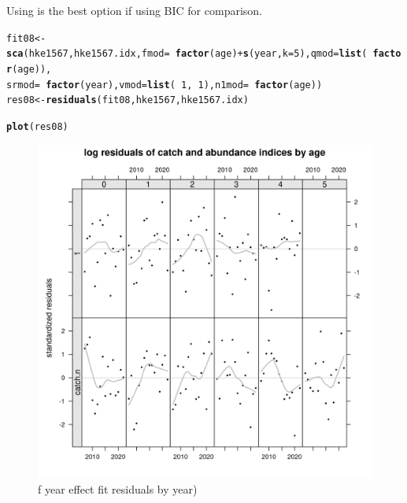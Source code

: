 \documentclass[a4paper,english,11pt]{article}\usepackage[]{graphicx}\usepackage[]{xcolor}
\makeatletter
\newcommand{\hlnum}[1]{\textcolor[rgb]{0.686,0.059,0.569}{#1}}%
\newcommand{\hlopt}[1]{\textcolor[rgb]{0,0,0}{#1}}%
\newcommand{\hldef}[1]{\textcolor[rgb]{0.345,0.345,0.345}{#1}}%
\newcommand{\hlkwb}[1]{\textcolor[rgb]{0.69,0.353,0.396}{#1}}%
\newcommand{\hlkwc}[1]{\textcolor[rgb]{0.333,0.667,0.333}{#1}}%
\newcommand{\hlkwd}[1]{\textcolor[rgb]{0.737,0.353,0.396}{\textbf{#1}}}%
\newenvironment{kframe}{%
 \def\at@end@of@kframe{}%
 \ifinner\ifhmode%
  \def\at@end@of@kframe{\end{minipage}}%
  \begin{minipage}{\columnwidth}%
 \fi\fi%
 \def\FrameCommand##1{\hskip\@totalleftmargin \hskip-\fboxsep
 \colorbox{shadecolor}{##1}\hskip-\fboxsep
     \hskip-\linewidth \hskip-\@totalleftmargin \hskip\columnwidth}%
 \MakeFramed {\advance\hsize-\width
   \@totalleftmargin\z@ \linewidth\hsize
   \@setminipage}}%
 {\par\unskip\endMakeFramed%
 \at@end@of@kframe}
\newenvironment{knitrout}{}{} %
\makeatother
\begin{document}
Using  is the best option if using BIC for comparison.

\begin{knitrout}
\color{fgcolor}\begin{kframe}
\begin{alltt}
\hldef{fit08} \hlkwb{<-} \hlkwd{sca}\hldef{(hke1567, hke1567.idx,} \hlkwc{fmod} \hldef{=} \hlopt{~}\hlkwd{factor}\hldef{(age)} \hlopt{+} \hlkwd{s}\hldef{(year,} \hlkwc{k} \hldef{=} \hlnum{5}\hldef{),} \hlkwc{qmod} \hldef{=} \hlkwd{list}\hldef{(}\hlopt{~}\hlkwd{factor}\hldef{(age)),}
    \hlkwc{srmod} \hldef{=} \hlopt{~}\hlkwd{factor}\hldef{(year),} \hlkwc{vmod} \hldef{=} \hlkwd{list}\hldef{(}\hlopt{~}\hlnum{1}\hldef{,} \hlopt{~}\hlnum{1}\hldef{),} \hlkwc{n1mod} \hldef{=} \hlopt{~}\hlkwd{factor}\hldef{(age))}
\hldef{res08} \hlkwb{<-} \hlkwd{residuals}\hldef{(fit08, hke1567, hke1567.idx)}
\end{alltt}
\end{kframe}
\end{knitrout}

\begin{knitrout}
\color{fgcolor}\begin{kframe}
\begin{alltt}
\hlkwd{plot}\hldef{(res08)}
\end{alltt}
\end{kframe}\begin{figure}[H]

{\centering \includegraphics[width=.9\linewidth]{figure/fksresbyyear-1} 

}

\caption[f year effect fit residuals by year)]{f year effect fit residuals by year)}\label{fig:fksresbyyear}
\end{figure}

\end{knitrout}
\end{document}
